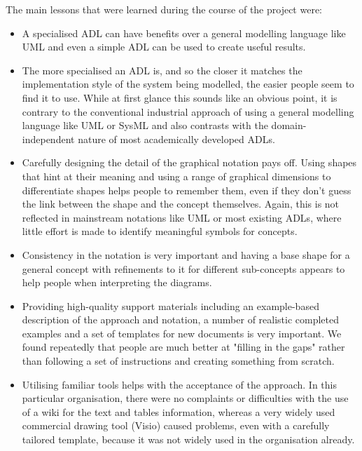 \begin{minipage}{\textwidth}
  The main lessons that were learned during the course of the project were: \nolinebreak
\begin{itemize}
\item A specialised ADL can have benefits over a general modelling language like UML and even a simple ADL can be used to create useful results.

\item The more specialised an ADL is, and so the closer it matches the implementation style of the system being modelled, the easier people seem to find it to use.  While at first glance this sounds like an obvious point, it is contrary to the conventional industrial approach of using a general modelling language like UML or SysML and also contrasts with the domain-independent nature of most academically developed ADLs.
\item Carefully designing the detail of the graphical notation pays off.  Using shapes that hint at their meaning and using a range of graphical dimensions to differentiate shapes helps people to remember them, even if they don't guess the link between the shape and the concept themselves.  Again, this is not reflected in mainstream notations like UML or most existing ADLs, where little effort is made to identify meaningful symbols for concepts.

\item Consistency in the notation is very important and having a base shape for a general concept with refinements to it for different sub-concepts appears to help people when interpreting the diagrams.

\item Providing high-quality support materials including an example-based description of the approach and notation, a number of realistic completed examples and a set of templates for new documents is very important.  We found repeatedly that people are much better at "filling in the gaps" rather than following a set of instructions and creating something from scratch.

\item Utilising familiar tools helps with the acceptance of the approach.  In this particular organisation, there were no complaints or difficulties with the use of a wiki for the text and tables information, whereas a very widely used commercial drawing tool (Visio) caused problems, even with a carefully tailored template, because it was not widely used in the organisation already.

\end{itemize}
\end{minipage}

